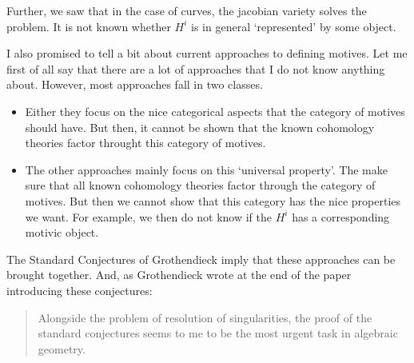 \documentclass[a4paper,10pt]{article}
\begin{document}
Further, we saw that in the case of curves, the jacobian variety solves the
problem. It is not known whether $H^{i}$ is in general `represented' by some
object.

I also promised to tell a bit about current approaches to defining motives. Let
me first of all say that there are a lot of approaches that I do not know
anything about. However, most approaches fall in two classes.
\begin{itemize} %
	\item Either they focus on the nice categorical aspects that the
		category of motives should have. But then, it cannot be shown
		that the known cohomology theories factor throught this
		category of motives.
	\item The other approaches mainly focus on this `universal property'.
		The make sure that all known cohomology theories factor through
		the category of motives. But then we cannot show that this
		category has the nice properties we want. For example, we then
		do not know if the $H^{i}$ has a corresponding motivic object.
\end{itemize} %
The Standard Conjectures of Grothendieck imply that these approaches can be
brought together. And, as Grothendieck wrote at the end of the paper \cite{sc}
introducing these conjectures:
\begin{quote} %
	Alongside the problem of resolution of singularities, the proof of the
	standard conjectures seems to me to be the most urgent task in
	algebraic geometry. 
\end{quote} %



\end{document}
